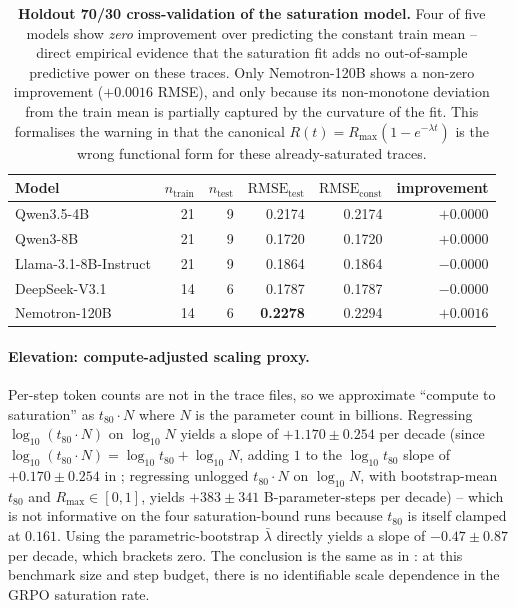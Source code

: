 \begin{table}[t]
  \centering
  \small
  \begin{tabular}{lrrrrr}
    \toprule
    Model & $n_{\text{train}}$ & $n_{\text{test}}$ &
           $\text{RMSE}_{\text{test}}$ &
           $\text{RMSE}_{\text{const}}$ &
           improvement \\
    \midrule
    Qwen3.5-4B            & 21 & 9 & 0.2174 & 0.2174 & $+0.0000$ \\
    Qwen3-8B              & 21 & 9 & 0.1720 & 0.1720 & $+0.0000$ \\
    Llama-3.1-8B-Instruct & 21 & 9 & 0.1864 & 0.1864 & $-0.0000$ \\
    DeepSeek-V3.1         & 14 & 6 & 0.1787 & 0.1787 & $-0.0000$ \\
    Nemotron-120B         & 14 & 6 & \textbf{0.2278} & 0.2294 & $+0.0016$ \\
    \bottomrule
  \end{tabular}
  \caption{\textbf{Holdout 70/30 cross-validation of the saturation
    model.}  Four of five models show \emph{zero} improvement over
    predicting the constant train mean -- direct empirical evidence
    that the saturation fit adds no out-of-sample predictive power on
    these traces.  Only Nemotron-120B shows a non-zero improvement
    ($+0.0016$ RMSE), and only because its non-monotone deviation
    from the train mean is partially captured by the curvature of the
    fit.  This formalises the warning in
     that the canonical
    $R(t) = R_{\max}(1 - e^{-\lambda t})$ is the wrong functional form
    for these already-saturated traces.}
  \label{tab:scaling-holdout}
\end{table}

\paragraph{Elevation: compute-adjusted scaling proxy.}
\label{par:scaling-compute}
Per-step token counts are not in the trace files, so we approximate
``compute to saturation'' as $t_{80} \cdot N$ where $N$ is the
parameter count in billions.  Regressing $\log_{10}(t_{80} \cdot N)$
on $\log_{10} N$ yields a slope of
$+1.170 \pm 0.254$ per decade (since $\log_{10}(t_{80}\cdot N) =
\log_{10} t_{80} + \log_{10} N$, adding $1$ to the $\log_{10} t_{80}$
slope of $+0.170 \pm 0.254$ in ;
regressing unlogged $t_{80}\cdot N$ on $\log_{10} N$, with
bootstrap-mean $t_{80}$ and $R_{\max}\in[0,1]$, yields
$+383 \pm 341$ B-parameter-steps per decade)
-- which is not informative on the four saturation-bound runs because
$t_{80}$ is itself clamped at $0.161$.  Using the parametric-bootstrap
$\bar\lambda$ directly yields a slope of $-0.47 \pm 0.87$ per decade,
which brackets zero.  The conclusion is the same as in
: at this benchmark size and step
budget, there is no identifiable scale dependence in the GRPO
saturation rate.


